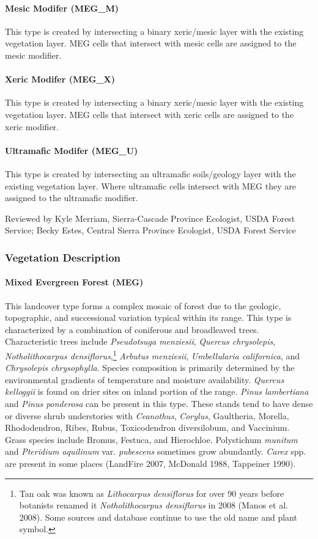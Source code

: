 \paragraph{Mesic Modifer (MEG\_M)}
This type is created by intersecting a binary xeric/mesic layer with the existing vegetation layer. MEG cells that intersect with mesic cells are assigned to the mesic modifier.
\paragraph{Xeric Modifer (MEG\_X)}
This type is created by intersecting a binary xeric/mesic layer with the existing vegetation layer. MEG cells that intersect with xeric cells are assigned to the xeric modifier.
\paragraph{Ultramafic Modifer (MEG\_U)}
This type is created by intersecting an ultramafic soils/geology layer with the existing vegetation layer. Where ultramafic cells intersect with MEG they are assigned to the ultramafic modifier.

\noindent Reviewed by Kyle Merriam, Sierra-Cascade Province Ecologist, USDA Forest Service; Becky Estes, Central Sierra Province Ecologist, USDA Forest Service


\subsubsection{Vegetation Description}
\paragraph{Mixed Evergreen Forest (MEG)} 	This landcover type forms a complex mosaic of forest due to the geologic, topographic, and successional variation typical within its range. This type is characterized by a combination of coniferous and broadleaved trees. Characteristic trees include \emph{Pseudotsuga menziesii}, \emph{Quercus chrysolepis}, \emph{Notholithocarpus densiflorus},\footnote{Tan oak was known as \emph{Lithocarpus densiflorus} for over 90 years before botanists renamed it \emph{Notholithocarpus densiflorus} in 2008 (Manos et al. 2008). Some sources and database continue to use the old name and plant symbol.}  \emph{Arbutus menziesii}, \emph{Umbellularia californica}, and \emph{Chrysolepis chrysophylla}. Species composition is primarily determined by the environmental gradients of temperature and moisture availability. \emph{Quercus kelloggii} is found on drier sites on inland portion of the range. \emph{Pinus lambertiana} and \emph{Pinus ponderosa} can be present in this type. These stands tend to have dense or diverse shrub understories with \emph{Ceanothus}, \emph{Corylus}, Gaultheria, Morella, Rhododendron, Ribes, Rubus, Toxicodendron diversilobum, and Vaccinium. Grass species include Bromus, Festuca, and Hierochloe. Polystichum \emph{munitum} and \emph{Pteridium aquilinum} var. \emph{pubescens} sometimes grow abundantly. \emph{Carex} spp. are present in some places (LandFire 2007, McDonald 1988, Tappeiner 1990).

